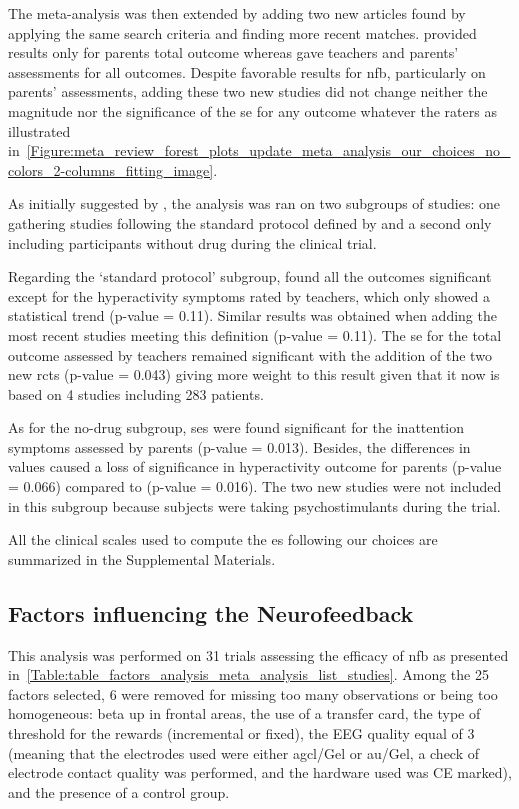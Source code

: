 The meta-analysis was then extended by adding two new articles \citep{Strehl2017, Baumeister2016} found 
by applying the same search criteria and finding more recent matches. \citet{Baumeister2016} provided results 
only for parents total outcome whereas \citet{Strehl2017} gave teachers and parents' assessments for all outcomes. 
Despite favorable results for \gls{nfb}, particularly on parents' assessments, adding these two new studies did not 
change neither the magnitude nor the significance of the \gls{se} for any outcome whatever the raters
as illustrated in~\ref{Figure:meta_review_forest_plots_update_meta_analysis_our_choices_no_colors_2-columns_fitting_image}. 
 
As initially suggested by \citeauthor{Cortese2016}, the analysis was ran on two subgroups of studies: one gathering 
studies following the standard protocol defined by \citet{Arns2014} and a second only including participants without 
drug during the clinical trial. 

Regarding the `standard protocol' subgroup, \citet{Cortese2016} found all the outcomes significant except for the 
hyperactivity symptoms rated by teachers, which only showed a statistical trend (p-value = 0.11). Similar results 
was obtained when adding the most recent studies meeting this definition \citep{Strehl2017} (p-value = 0.11). 
The \gls{se} for the total outcome assessed by teachers remained significant with the addition of the two new
\glspl{rct} (p-value = 0.043) giving more weight to this result given that it now is based on 4 studies including 283
patients.

As for the no-drug subgroup, \glspl{se} were found significant for the inattention symptoms assessed by parents (p-value = 0.013). 
Besides, the differences in \citet{Arnold2014} values caused a loss of significance in hyperactivity outcome for parents 
(p-value = 0.066) compared to \citet{Cortese2016} (p-value = 0.016). The two new studies were not included in this 
subgroup because subjects were taking psychostimulants during the trial.

All the clinical scales used to compute the \gls{es} following our choices are summarized in the Supplemental Materials.

\subsection{Factors influencing the Neurofeedback}

This analysis was performed on 31 trials assessing the efficacy of \gls{nfb} as presented 
in~\ref{Table:table_factors_analysis_meta_analysis_list_studies}. Among the 25 factors selected, 6 were 
removed for missing too many observations or being too homogeneous: beta up in frontal areas, 
the use of a transfer card, the type of threshold for the rewards (incremental or fixed), the EEG quality equal of 3
(meaning that the electrodes used were either \gls{agcl}/Gel or \gls{au}/Gel, a check of electrode contact quality was
performed, and the hardware used was CE marked), and the presence of a control group. 

